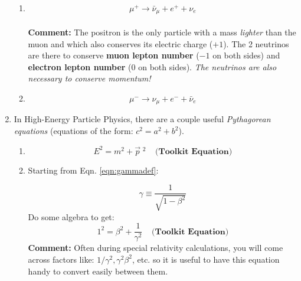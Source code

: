 \documentclass[11pt]{article}
\begin{document}
\begin{enumerate}
\begin{enumerate}
        \item 
        $$\mu^{+} \to \bar{\nu}_{\mu} + e^{+} + \nu_{e}$$ \\
        {\centering \textbf{Comment:} 
        The positron is the only particle with a mass \textit{lighter} than the muon
        and which also conserves its electric charge ($+1$). 
        The 2 neutrinos are there to conserve 
        \textbf{muon lepton number} ($-1$ on both sides) and 
        \textbf{electron lepton number} (0 on both sides). 
        \textit{The neutrinos are also necessary to conserve momentum!}
        }

        \item 
        $$\mu^{-} \to \nu_{\mu} + e^{-} + \bar{\nu}_{e}$$
        
    \end{enumerate}

\item In High-Energy Particle Physics, there are a couple useful \textit{Pythagorean equations} 
(equations of the form: $c^2 = a^2 + b^2$).
    \begin{enumerate}
    \item 
    $$E^2 = m^2 + {\vec{p}}\;^2 \;\;\;\;{\textbf{(Toolkit Equation)}}$$
    \item Starting from Eqn. \ref{eqn:gammadef}:
    
    $$\gamma \equiv \frac{1}{\sqrt{1 - \beta ^2}}$$
    Do some algebra to get:
    $$1^2 = \beta^{2} + \frac{1}{\gamma^{2}} \;\;\;\;{\textbf{(Toolkit Equation)}}$$
    {\centering \textbf{Comment:} 
        Often during special relativity calculations, you will come across
        factors like: $1/\gamma^2, \gamma^2 \beta^2$, etc. so it is useful
        to have this equation handy to convert easily between them.
    }
    \end{enumerate}
\end{enumerate}
\end{document}
